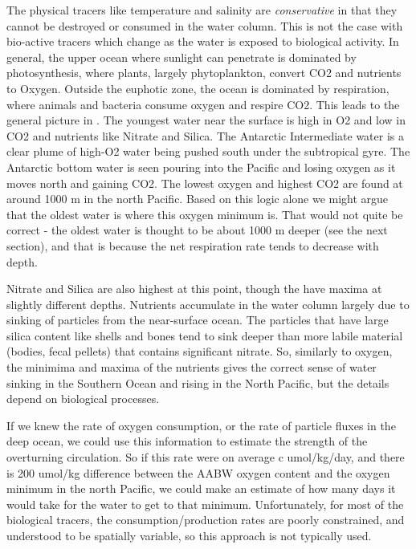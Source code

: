 The physical tracers like temperature and salinity are \emph{conservative} in that they cannot be destroyed or consumed in the water column.  This is not the case with bio-active tracers which change as the water is exposed to biological activity.   In general, the upper ocean where sunlight can penetrate is dominated by photosynthesis, where plants, largely phytoplankton,  convert CO2 and nutrients to Oxygen.  Outside the euphotic zone, the ocean is dominated by respiration, where animals and bacteria consume oxygen and respire CO2.  This leads to the general picture in .  The youngest water near the surface is high in O2 and low in CO2 and nutrients like Nitrate and Silica.  The Antarctic Intermediate water is a clear plume of high-O2 water being pushed south under the subtropical gyre.  The Antarctic bottom water is seen pouring into the  Pacific and losing oxygen as it moves north and gaining CO2.  The lowest oxygen and highest CO2 are found at around 1000 m in the north Pacific. Based on this logic alone we might argue that the oldest water is where this oxygen minimum is.  That would not quite be correct - the oldest water is thought to be about 1000 m deeper (see the next section), and that is because the net respiration rate tends to decrease with depth.    

Nitrate and Silica are also highest at this point, though the have maxima at slightly different depths.  Nutrients accumulate in the water column largely due to sinking of particles from the near-surface ocean. The particles that have large silica content like shells and bones tend to sink deeper than more labile material (bodies, fecal pellets) that contains significant nitrate.  So, similarly to oxygen, the minimima and maxima of the nutrients gives the correct sense of water sinking in the Southern Ocean and rising in the North Pacific, but the details depend on biological processes.  

If we knew the rate of oxygen consumption, or the rate of particle fluxes in the deep ocean, we could use this information to estimate the strength of the overturning circulation.  So if  this rate were on average c umol/kg/day, and there is 200 umol/kg difference between the AABW oxygen content and the oxygen minimum in the north Pacific, we could make an estimate of how many days it would take for the water to get to that minimum.  Unfortunately, for most of the biological tracers, the consumption/production rates are poorly constrained, and understood to be spatially variable, so this approach is not typically used.  

